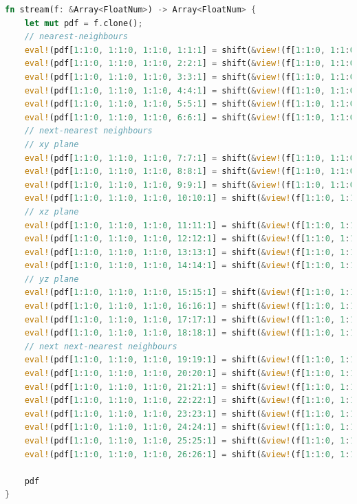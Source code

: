 \begin{lstlisting}[language=Rust, caption=Streaming with \texttt{shift} function for three dimensions with 27 discrete speeds (D3Q27)., label=rust-streaming-3d]
fn stream(f: &Array<FloatNum>) -> Array<FloatNum> {
	let mut pdf = f.clone();
	// nearest-neighbours
	eval!(pdf[1:1:0, 1:1:0, 1:1:0, 1:1:1] = shift(&view!(f[1:1:0, 1:1:0, 1:1:0, 1:1:1]), &[ 1, 0, 0, 0]));
	eval!(pdf[1:1:0, 1:1:0, 1:1:0, 2:2:1] = shift(&view!(f[1:1:0, 1:1:0, 1:1:0, 2:2:1]), &[ -1, 0, 0, 0]));
	eval!(pdf[1:1:0, 1:1:0, 1:1:0, 3:3:1] = shift(&view!(f[1:1:0, 1:1:0, 1:1:0, 3:3:1]), &[ 0, 1, 0, 0]));
	eval!(pdf[1:1:0, 1:1:0, 1:1:0, 4:4:1] = shift(&view!(f[1:1:0, 1:1:0, 1:1:0, 4:4:1]), &[ 0, -1, 0, 0]));
	eval!(pdf[1:1:0, 1:1:0, 1:1:0, 5:5:1] = shift(&view!(f[1:1:0, 1:1:0, 1:1:0, 5:5:1]), &[ 0, 0, 1, 0]));
	eval!(pdf[1:1:0, 1:1:0, 1:1:0, 6:6:1] = shift(&view!(f[1:1:0, 1:1:0, 1:1:0, 6:6:1]), &[ 0, 0, -1, 0]));
	// next-nearest neighbours
	// xy plane
	eval!(pdf[1:1:0, 1:1:0, 1:1:0, 7:7:1] = shift(&view!(f[1:1:0, 1:1:0, 1:1:0, 7:7:1]), &[ 1, 1, 0, 0]));
	eval!(pdf[1:1:0, 1:1:0, 1:1:0, 8:8:1] = shift(&view!(f[1:1:0, 1:1:0, 1:1:0, 8:8:1]), &[ -1, 1, 0, 0]));
	eval!(pdf[1:1:0, 1:1:0, 1:1:0, 9:9:1] = shift(&view!(f[1:1:0, 1:1:0, 1:1:0, 9:9:1]), &[ 1, -1, 0, 0]));
	eval!(pdf[1:1:0, 1:1:0, 1:1:0, 10:10:1] = shift(&view!(f[1:1:0, 1:1:0, 1:1:0, 10:10:1]), &[ -1, -1, 0, 0]));
	// xz plane
	eval!(pdf[1:1:0, 1:1:0, 1:1:0, 11:11:1] = shift(&view!(f[1:1:0, 1:1:0, 1:1:0, 11:11:1]), &[ 1, 0, 1, 0]));
	eval!(pdf[1:1:0, 1:1:0, 1:1:0, 12:12:1] = shift(&view!(f[1:1:0, 1:1:0, 1:1:0, 12:12:1]), &[ -1, 0, 1, 0]));
	eval!(pdf[1:1:0, 1:1:0, 1:1:0, 13:13:1] = shift(&view!(f[1:1:0, 1:1:0, 1:1:0, 13:13:1]), &[ 1, 0, -1, 0]));
	eval!(pdf[1:1:0, 1:1:0, 1:1:0, 14:14:1] = shift(&view!(f[1:1:0, 1:1:0, 1:1:0, 14:14:1]), &[ -1, 0, -1, 0]));
	// yz plane
	eval!(pdf[1:1:0, 1:1:0, 1:1:0, 15:15:1] = shift(&view!(f[1:1:0, 1:1:0, 1:1:0, 15:15:1]), &[ 0, 1, 1, 0]));
	eval!(pdf[1:1:0, 1:1:0, 1:1:0, 16:16:1] = shift(&view!(f[1:1:0, 1:1:0, 1:1:0, 16:16:1]), &[ 0, -1, 1, 0]));
	eval!(pdf[1:1:0, 1:1:0, 1:1:0, 17:17:1] = shift(&view!(f[1:1:0, 1:1:0, 1:1:0, 17:17:1]), &[ 0, 1, -1, 0]));
	eval!(pdf[1:1:0, 1:1:0, 1:1:0, 18:18:1] = shift(&view!(f[1:1:0, 1:1:0, 1:1:0, 18:18:1]), &[ 0, -1, -1, 0]));
	// next next-nearest neighbours
	eval!(pdf[1:1:0, 1:1:0, 1:1:0, 19:19:1] = shift(&view!(f[1:1:0, 1:1:0, 1:1:0, 19:19:1]), &[ 1, 1, 1, 0]));
	eval!(pdf[1:1:0, 1:1:0, 1:1:0, 20:20:1] = shift(&view!(f[1:1:0, 1:1:0, 1:1:0, 20:20:1]), &[ -1, 1, 1, 0]));
	eval!(pdf[1:1:0, 1:1:0, 1:1:0, 21:21:1] = shift(&view!(f[1:1:0, 1:1:0, 1:1:0, 21:21:1]), &[ 1, -1, 1, 0]));
	eval!(pdf[1:1:0, 1:1:0, 1:1:0, 22:22:1] = shift(&view!(f[1:1:0, 1:1:0, 1:1:0, 22:22:1]), &[ -1, -1, 1, 0]));
	eval!(pdf[1:1:0, 1:1:0, 1:1:0, 23:23:1] = shift(&view!(f[1:1:0, 1:1:0, 1:1:0, 23:23:1]), &[ 1, 1, -1, 0]));
	eval!(pdf[1:1:0, 1:1:0, 1:1:0, 24:24:1] = shift(&view!(f[1:1:0, 1:1:0, 1:1:0, 24:24:1]), &[ -1, 1, -1, 0]));
	eval!(pdf[1:1:0, 1:1:0, 1:1:0, 25:25:1] = shift(&view!(f[1:1:0, 1:1:0, 1:1:0, 25:25:1]), &[ 1, -1, -1, 0]));
	eval!(pdf[1:1:0, 1:1:0, 1:1:0, 26:26:1] = shift(&view!(f[1:1:0, 1:1:0, 1:1:0, 26:26:1]), &[ -1, -1, -1, 0]));
	
	pdf
}
\end{lstlisting}


